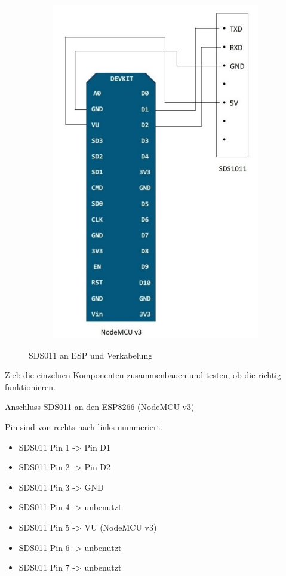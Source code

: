 \documentclass[draft=false
              ,paper=a4
              ,twoside=false
              ,fontsize=10pt
              ,headsepline
              ,BCOR10mm
              ,DIV11
              ]{article}
\begin{document}
\begin{figure}[h!]
\begin{subfigure}[b]{0.38\linewidth}
    \includegraphics[width=\linewidth]{SDS011anESP}
  \end{subfigure}
  \caption{SDS011 an ESP und Verkabelung}
  \label{fig:test_day_1}
\end{figure}

Ziel: die einzelnen Komponenten zusammenbauen und testen, ob die richtig funktionieren.

Anschluss SDS011 an den ESP8266 (NodeMCU v3)

Pin sind von rechts nach links nummeriert. 

\begin{itemize}
\item SDS011 Pin 1 -> Pin D1 
\item SDS011 Pin 2 -> Pin D2 
\item SDS011 Pin 3 -> GND
\item SDS011 Pin 4 -> unbenutzt
\item SDS011 Pin 5 -> VU (NodeMCU v3) 
\item SDS011 Pin 6 -> unbenutzt
\item SDS011 Pin 7 -> unbenutzt
\end{itemize}
\end{document}
